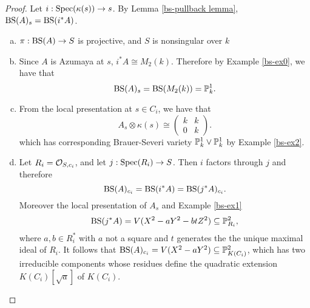 \begin{proof} Let $i: \textnormal{Spec}(\kappa(s))\rightarrow s$.  By Lemma \ref{bs-pullback lemma}, $\textnormal{BS}(A)_s = \textnormal{BS}(i^*A)$.
\begin{enumerate}[(a)]
\item  $\pi: \textnormal{BS}(A)\rightarrow S$ is projective, and $S$ is nonsingular over $k$
\item  Since $A$ is Azumaya at $s$, $i^*A\cong M_2(k)$.  Therefore by Example \ref{bs-ex0}, we have that
$$\textnormal{BS}(A)_s = \textnormal{BS}(M_2(k)) = \mathbb{P}^1_k.$$
\item
From the local presentation at $s\in C_i$, we have that
$$A_s\otimes\kappa(s) \cong\left(\begin{array}{cc}
k & k\\
0 & k
\end{array}\right).$$
which has corresponding Brauer-Severi variety $\mathbb{P}^1_k\vee\mathbb{P}^1_k$ by Example \ref{bs-ex2}.
\item
Let $R_i = \mathcal{O}_{S,c_i}$, and let $j: \textnormal{Spec}(R_i)\rightarrow S$.  Then $i$ factors through $j$ and therefore
$$\textnormal{BS}(A)_{c_i} = \textnormal{BS}(i^*A) = \textnormal{BS}(j^*A)_{c_i}.$$
Moreover the local presentation of $A_s$ and Example \ref{bs-ex1}
$$\textnormal{BS}(j^*A) = V(X^2 - aY^2 - btZ^2)\subseteq \mathbb{P}^2_{R_i},$$
where $a,b\in R_i^*$ with $a$ not a square and $t$ generates the the unique maximal ideal of $R_i$.  It follows that $\textnormal{BS}(A)_{c_i} = V(X^2-aY^2)\subseteq \mathbb{P}^2_{K(C_i)}$, which has two irreducible components whose residues define the quadratic extension $K(C_i)[\sqrt{a}]$ of $K(C_i)$.
\end{enumerate}
\end{proof}

